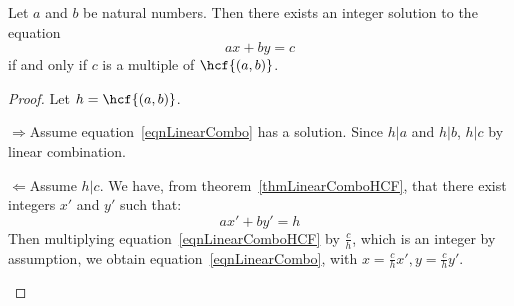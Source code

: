 \documentclass[../Main.tex]{subfiles}
\begin{document}
\begin{theorem}
    Let $a$ and $b$ be natural numbers. Then there exists an integer solution to the equation
    \begin{equation}
        a x + b y = c
        \label{eqnLinearCombo}
    \end{equation}
    if and only if $c$ is a multiple of $\hcf{(a, b)}$.
    \label{thmBezout}
\end{theorem}
\begin{proof}
    Let $h = \hcf{(a, b)}$.
    \begin{proofdirection}{$\Rightarrow$}{Assume equation~\ref{eqnLinearCombo} has a solution.}
        Since $h | a$ and $h | b$, $h | c$ by linear combination.
    \end{proofdirection}
    \begin{proofdirection}{$\Leftarrow$}{Assume $h | c$.}
        We have, from theorem~\ref{thmLinearComboHCF}, that there exist integers $x'$ and $y'$ such that:
        \begin{equation}
            a x' + b y' = h
            \label{eqnLinearComboHCF}
        \end{equation}
        Then multiplying equation~\ref{eqnLinearComboHCF} by $\frac{c}{h}$, which is an integer by assumption, we obtain equation~\ref{eqnLinearCombo}, with $x = \frac{c}{h}x', y = \frac{c}{h}y'$.
    \end{proofdirection}
\end{proof}
\end{document}
